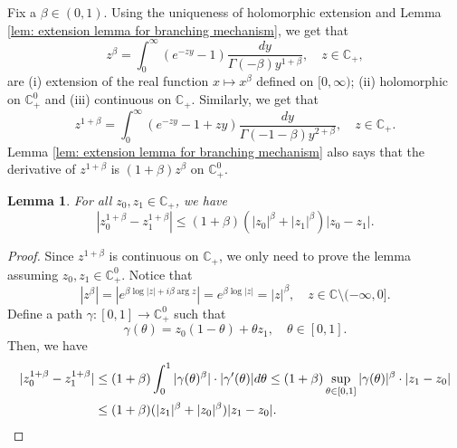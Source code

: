 \documentclass[12pt,a4paper]{amsart}
\theoremstyle{plain}
\newtheorem{lem}[thm]{Lemma}
\theoremstyle{definition}
\numberwithin{equation}{section}
\begin{document}
    Fix a $\beta \in (0,1)$.
    Using the uniqueness of holomorphic extension and Lemma \ref{lem: extension lemma for branching mechanism}, we get that
\begin{equation}
    z^{\beta}
	= \int_0^\infty (e^{-zy}-1) \frac{dy}{\Gamma(-\beta)y^{1+\beta}},
    \quad z\in \mathbb C_+,
\end{equation}
are (i)  extension of the real function $x\mapsto x^{\beta}$ defined on $[0,\infty)$;
(ii) holomorphic on $\mathbb C_+^0$ and (iii) continuous on $\mathbb C_+$.
    Similarly, we get that
\begin{equation}
\label{eq: stable branching on C+}
    z^{1+\beta}
    = \int_0^\infty (e^{-zy}-1+zy)\frac{dy}{\Gamma(-1-\beta)y^{2+\beta}},
    \quad z\in \mathbb C_+.
\end{equation}
    Lemma \ref{lem: extension lemma for branching mechanism} also says that the derivative of $z^{1+\beta}$ is $(1+\beta)z^{\beta}$ on $\mathbb C^0_+$.
\begin{lem}
\label{lem: Lip of power function}
    For all $z_0,z_1 \in \mathbb C_+$, we have
\begin{equation}
\label{eq: Lip of power function}
    |z_0^{1+\beta} - z_1^{1+\beta}|
    \leq (1+\beta)(|z_0|^{\beta}+|z_1|^{\beta})|z_0 - z_1|.
\end{equation}

\end{lem}
\begin{proof}
    Since $z^{1+\beta}$ is continuous on $\mathbb C_+$, we only need to prove the lemma assuming $z_0,z_1 \in \mathbb C^0_+$.
    Notice that
\begin{equation}
\label{eq: upper bound for beta power of z}
	|z^\beta|
	= |e^{\beta \log |z| +i\beta \operatorname {arg}z}| = e^{\beta \log |z|} = |z|^\beta,
	\quad z \in \mathbb C\setminus (-\infty, 0].
\end{equation}
    Define a path $\gamma: [0,1] \to \mathbb C^0_+$ such that
\[
    \gamma(\theta)
    = z_0 (1-\theta) + \theta z_1,
    \quad \theta \in [0,1].
\]
    Then, we have
\begin{align}
    |z_0^{1+\beta} - z_1^{1+\beta}|
    &\leq (1+\beta) \int_0^1 |\gamma(\theta)^{\beta}|\cdot |\gamma'(\theta)|d\theta
    \leq (1+\beta)  \sup_{\theta \in [0,1]} |\gamma(\theta)|^{\beta} \cdot |z_1-z_0|
    \\&\leq (1+\beta)  ( |z_1|^{\beta}+|z_0|^{\beta} ) |z_1-z_0|.
    \qedhere
\end{align}
\end{proof}
\end{document}
